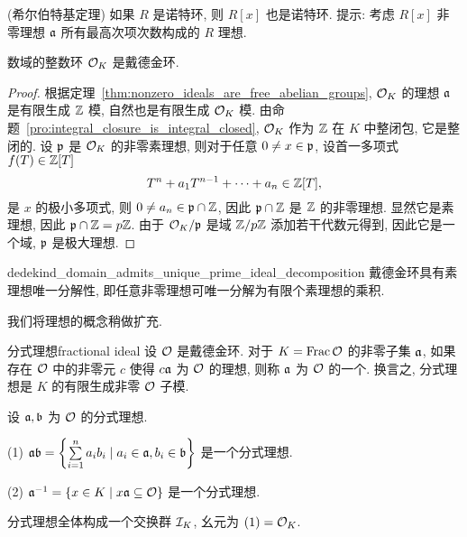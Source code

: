 \begin{exercise}
(希尔伯特基定理) 如果 $R$ 是诺特环, 则 $R[x]$ 也是诺特环. 提示: 考虑 $R[x]$ 非零理想 ${\mathfrak{a}}$ 所有最高次项次数构成的 $R$ 理想.
\end{exercise}

\begin{theorem}{}{}
数域的整数环 ${\mathcal{O}}_K$ 是戴德金环.
\end{theorem}
\begin{proof}
根据定理~\ref{thm:nonzero_ideals_are_free_abelian_groups}, ${\mathcal{O}}_K$ 的理想 ${\mathfrak{a}}$ 是有限生成 ${\mathbb{Z}}$ 模, 自然也是有限生成 ${\mathcal{O}}_K$ 模. 由命题~\ref{pro:integral_closure_is_integral_closed}, ${\mathcal{O}}_K$ 作为 ${\mathbb{Z}}$ 在 $K$ 中整闭包, 它是整闭的. 设 ${\mathfrak{p}}$ 是 ${\mathcal{O}}_K$ 的非零素理想, 则对于任意 $0\neq x\in{\mathfrak{p}}$, 设首一多项式 $f(T)\in{\mathbb{Z}}[T]$
  \[T^n+a_1T^{n-1}+\dots+a_n\in{\mathbb{Z}}[T],\]
是 $x$ 的极小多项式, 则 $0\neq a_n\in{\mathfrak{p}}\cap {\mathbb{Z}}$, 因此 ${\mathfrak{p}}\cap {\mathbb{Z}}$ 是 ${\mathbb{Z}}$ 的非零理想. 显然它是素理想, 因此 ${\mathfrak{p}}\cap{\mathbb{Z}}=p{\mathbb{Z}}$. 由于 ${\mathcal{O}}_K/{\mathfrak{p}}$ 是域 ${\mathbb{Z}}/p{\mathbb{Z}}$ 添加若干代数元得到, 因此它是一个域, ${\mathfrak{p}}$ 是极大理想.  
\end{proof}

\begin{theorem}{}{dedekind_domain_admits_unique_prime_ideal_decomposition}
戴德金环具有素理想唯一分解性, 即任意非零理想可唯一分解为有限个素理想的乘积.
\end{theorem}

我们将理想的概念稍做扩充.

\begin{definition}{分式理想}{fractional ideal}
设 ${\mathcal{O}}$ 是戴德金环. 对于 $K={\mathrm{Frac}\,} {\mathcal{O}}$ 的非零子集 ${\mathfrak{a}}$, 如果存在 ${\mathcal{O}}$ 中的非零元 $c$ 使得 $c{\mathfrak{a}}$ 为 ${\mathcal{O}}$ 的理想, 则称 ${\mathfrak{a}}$ 为 ${\mathcal{O}}$ 的一个. 换言之, 分式理想是 $K$ 的有限生成非零 ${\mathcal{O}}$ 子模.
\end{definition}

\begin{exercise}
设 ${\mathfrak{a}},{\mathfrak{b}}$ 为 ${\mathcal{O}}$ 的分式理想.

(1) ${\mathfrak{a}}{\mathfrak{b}}=\left\{\sum\limits_{i=1}^n a_ib_i\mid a_i\in{\mathfrak{a}},b_i\in{\mathfrak{b}}\right\}$
 是一个分式理想.
 
(2) ${\mathfrak{a}}^{-1}=\left\{x\in K\mid x{\mathfrak{a}}\subseteq{\mathcal{O}}\right\}$ 是一个分式理想.
\end{exercise}

\begin{exercise}
分式理想全体构成一个交换群 ${\mathcal{I}}_K$, 幺元为 $(1)={\mathcal{O}}_K$.
\end{exercise}

